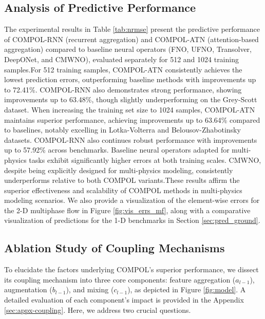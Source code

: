 \subsection{Analysis of Predictive Performance}
The experimental results in Table \ref{tab:nrmse} present the predictive performance of COMPOL-RNN (recurrent aggregation) and COMPOL-ATN (attention-based aggregation) compared to baseline neural operators (FNO, UFNO, Transolver, DeepONet, and CMWNO), evaluated separately for 512 and 1024 training samples.For 512 training samples, COMPOL-ATN consistently achieves the lowest prediction errors, outperforming baseline methods with improvements up to 72.41\%. COMPOL-RNN also demonstrates strong performance, showing improvements up to 63.48\%, though slightly underperforming on the Grey-Scott dataset. When increasing the training set size to 1024 samples, COMPOL-ATN maintains superior performance, achieving improvements up to 63.64\% compared to baselines, notably excelling in Lotka-Volterra and Belousov-Zhabotinsky datasets. COMPOL-RNN also continues robust performance with improvements up to 57.92\% across benchmarks. Baseline neural operators adapted for multi-physics tasks exhibit significantly higher errors at both training scales. CMWNO, despite being explicitly designed for multi-physics modeling, consistently underperforms relative to both COMPOL variants.These results affirm the superior effectiveness and scalability of COMPOL methods in multi-physics modeling scenarios. We also provide a visualization of the element-wise errors for the 2-D multiphase flow in Figure \ref{fig:vis_errs_mf}, along with a comparative visualization of predictions for the 1-D benchmarks in Section \ref{sec:pred_ground}.


\subsection{Ablation Study of Coupling Mechanisms}
To elucidate the factors underlying COMPOL’s superior performance, we dissect its coupling mechanism into three core components: feature aggregation ($a_{l-1}$), augmentation ($b_{l-1}$), and mixing ($c_{l-1}$), as depicted in Figure \ref{fig:model}. A detailed evaluation of each component's impact is provided in the Appendix \ref{sec:appx-coupling}. Here, we address two crucial questions.

